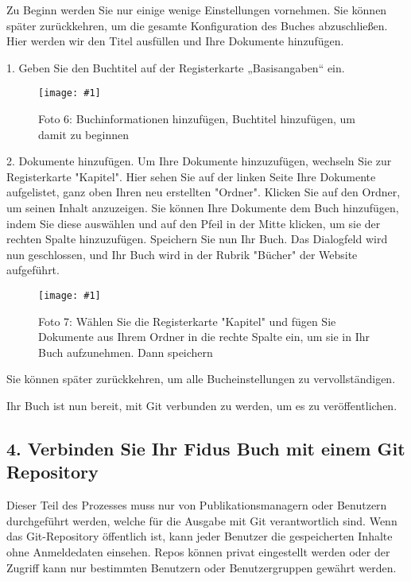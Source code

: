 \documentclass{article}
\newlength{\imgwidth}
\newcommand\scaledgraphics[2]{%
                
\settowidth{\imgwidth}{\texttt{[image: \#1]}}%
                
\setlength{\imgwidth}{\minof{\imgwidth}{#2\textwidth}}%
                
\texttt{[image: \#1]}%
                
}
\begin{document}
Zu Beginn werden Sie nur einige wenige Einstellungen vornehmen. Sie können später zurückkehren, um die gesamte Konfiguration des Buches abzuschließen. Hier werden wir den Titel ausfüllen und Ihre Dokumente hinzufügen.


1. Geben Sie den Buchtitel auf der Registerkarte „Basisangaben“ ein.

\begin{figure}
\scaledgraphics{ba321105-5867-457f-a1d8-5722ae3ffc7e.png}{1}
\caption*{Foto 6: Buchinformationen hinzufügen, Buchtitel hinzufügen, um damit zu beginnen}\label{F70457681}
\end{figure}


2. Dokumente hinzufügen. Um Ihre Dokumente hinzuzufügen, wechseln Sie zur Registerkarte "Kapitel". Hier sehen Sie auf der linken Seite Ihre Dokumente aufgelistet, ganz oben Ihren neu erstellten "Ordner". Klicken Sie auf den Ordner, um seinen Inhalt anzuzeigen. Sie können Ihre Dokumente dem Buch hinzufügen, indem Sie diese auswählen und auf den Pfeil in der Mitte klicken, um sie der rechten Spalte hinzuzufügen. Speichern Sie nun Ihr Buch. Das Dialogfeld wird nun geschlossen, und Ihr Buch wird in der Rubrik "Bücher" der Website aufgeführt.

\begin{figure}
\scaledgraphics{e3b528b3-71a2-4efe-990d-e9914c328695.png}{1}
\caption*{Foto 7: Wählen Sie die Registerkarte "Kapitel" und fügen Sie Dokumente aus Ihrem Ordner in die rechte Spalte ein, um sie in Ihr Buch aufzunehmen. Dann speichern}\label{F19256461}
\end{figure}


Sie können später zurückkehren, um alle Bucheinstellungen zu vervollständigen.


Ihr Buch ist nun bereit, mit Git verbunden zu werden, um es zu veröffentlichen.


\subsection{4. Verbinden Sie Ihr Fidus Buch mit einem Git Repository}\label{H4837045}



Dieser Teil des Prozesses muss nur von Publikationsmanagern oder Benutzern durchgeführt werden, welche für die Ausgabe mit Git verantwortlich sind. Wenn das Git-Repository öffentlich ist, kann jeder Benutzer die gespeicherten Inhalte ohne Anmeldedaten einsehen. Repos können privat eingestellt werden oder der Zugriff kann nur bestimmten Benutzern oder Benutzergruppen gewährt werden.
\end{document}

